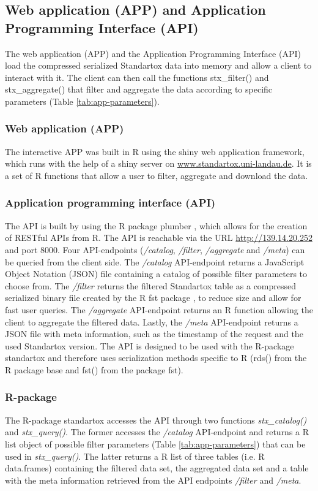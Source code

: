 \subsection*{Web application (APP) and Application Programming Interface (API)}
The web application (APP) and the Application Programming Interface (API) load the compressed serialized Standartox data into memory and allow a client to interact with it. The client can then call the functions stx\_filter() and stx\_aggregate() that filter and aggregate the data according to specific parameters (Table \ref{tab:app-parameters}).

\subsubsection*{Web application (APP)}
The interactive APP was built in R using the shiny web application framework, which runs with the help of a shiny server \citep{chang_shiny_2018} on \url{www.standartox.uni-landau.de}. It is a set of R functions that allow a user to filter, aggregate and download the data.

\subsubsection*{Application programming interface (API)}
The API is built by using the R package plumber \citep{trestletechnologyllc_plumber_2018}, which allows for the creation of RESTful APIs from R. The API is reachable via the URL \url{http://139.14.20.252} and port 8000. Four API-endpoints (\textit{/catalog}, \textit{/filter}, \textit{/aggregate} and \textit{/meta}) can be queried from the client side. The \textit{/catalog} API-endpoint returns a JavaScript Object Notation (JSON) file containing a catalog of possible filter parameters to choose from. The \textit{/filter} returns the filtered Standartox table as a compressed serialized binary file created by the R fst package \citep{klik_fst_2019}, to reduce size and allow for fast user queries. The \textit{/aggregate} API-endpoint returns an R function allowing the client to aggregate the filtered data. Lastly, the \textit{/meta} API-endpoint returns a JSON file with meta information, such as the timestamp of the request and the used Standartox version. The API is designed to be used with the R-package standartox and therefore uses serialization methods specific to R (rds() from the R package base and fst() from the package fst).

\subsubsection*{R-package}
The R-package standartox accesses the API through two functions \textit{stx\_catalog()} and \textit{stx\_query()}. The former accesses the \textit{/catalog} API-endpoint and returns a R list object of possible filter parameters (Table \ref{tab:app-parameters}) that can be used in \textit{stx\_query()}. The latter returns a R list of three tables (i.e. R data.frames) containing the filtered data set, the aggregated data set and a table with the meta information retrieved from the API endpoints \textit{/filter} and \textit{/meta}.

